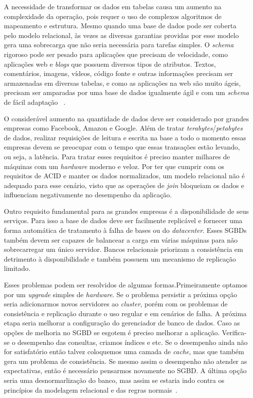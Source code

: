 A necessidade de transformar os dados em tabelas causa um aumento na complexidade da operação, pois requer o uso de complexos algoritmos de mapeamento e estrutura. Mesmo quando uma base de dados pode ser coberta pelo modelo relacional, às vezes as diversas garantias providas por esse modelo gera uma sobrecarga que não seria necessária para tarefas simples. O \textit{schema} rigoroso pode ser pesado para aplicações que precisam de velocidade, como aplicações web e \textit{blogs} que possuem diversos tipos de atributos. Textos, comentários, imagens, vídeos, código fonte e outras informações precisam ser armazenadas em diversas tabelas, e como as aplicações na web são muito ágeis, precisam ser amparadas por uma base de dados igualmente ágil e com um \textit{schema} de fácil adaptação ~\cite{nosqlevaluation}.

O considerável aumento na quantidade de dados deve ser considerado por grandes empresas como Facebook, Amazon e Google. Além de tratar \textit{terabytes}/\textit{petabytes} de dados, realizar requisições de leitura e escrita na base a todo o momento essas empresas devem se preocupar com o tempo que essas transações estão levando, ou seja, a latência. Para tratar esses requisitos é preciso manter milhares de máquinas com um \textit{hardware} moderno e veloz. Por ter que cumprir com os requisitos de ACID e manter os dados normalizados, um modelo relacional não é adequado para esse cenário, visto que as operações de \textit{join} bloqueiam os dados e influenciam negativamente no desempenho da aplicação.

Outro requisito fundamental para as grandes empresas é a disponibilidade de seus serviços. Para isso a base de dados deve ser facilmente replicável e fornecer uma forma automática de tratamento à falha de bases ou do \textit{datacenter}. Esses SGBDs também devem ser capazes de balancear a carga em várias máquinas para não sobrecarregar um único servidor. Bancos relacionais priorizam a consistência em detrimento à disponibilidade e também possuem um mecanismo de replicação limitado.

Esses problemas podem ser resolvidos de algumas formas.Primeiramente optamos por um \textit{upgrade} simples de \textit{hardware}. Se o problema persistir a próxima opção seria adicionarmos novos servidores ao \textit{cluster}, porém com os problemas de consistência e replicação durante o uso regular e em cenários de falha. A próxima etapa seria melhorar a configuração do gerenciador de banco de dados. Caso as opções de melhoria no SGBD se esgotem é preciso melhorar a aplicação. Verifica-se o desempenho das consultas, criamos índices e etc. Se o desempenho ainda não for satisfatório então talvez coloquemos uma camada de \textit{cache}, mas que também gera um problema de consistência. Se mesmo assim o desempenho não atender as expectativas, então é necessário pensarmos novamente no SGBD. A última opção seria uma desnormarlização do banco, mas assim se estaria indo contra os princípios da modelagem relacional e das regras normais~\cite{cassandraguide}.

